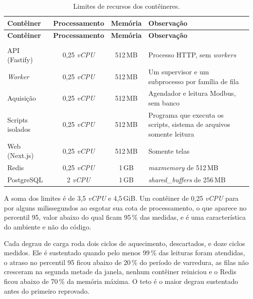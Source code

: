 {\renewcommand{\arraystretch}{1.3}\small
\begin{xltabular}{\textwidth}{lccX}
        \caption{Limites de recursos dos contêineres.}
        \label{tab:cap7_limites}\\
        \hline
        \textbf{Contêiner} & \textbf{Processamento} & \textbf{Memória} & \textbf{Observação} \\
        \hline
        \endfirsthead
        \hline
        \textbf{Contêiner} & \textbf{Processamento} & \textbf{Memória} & \textbf{Observação} \\
        \hline
        \endhead
        \endfoot
         \\
        \endlastfoot
        API (Fastify) & 0,25 \emph{vCPU} & 512\,MB & Processo HTTP, sem \emph{workers} \\
        \hline
        \emph{Worker} & 0,25 \emph{vCPU} & 512\,MB & Um supervisor e um subprocesso por família de fila \\
        \hline
        Aquisição & 0,25 \emph{vCPU} & 512\,MB & Agendador e leitura Modbus, sem banco \\
        \hline
        Scripts isolados & 0,25 \emph{vCPU} & 512\,MB & Programa que executa os scripts, sistema de arquivos somente leitura \\
        \hline
        Web (Next.js) & 0,25 \emph{vCPU} & 512\,MB & Somente telas \\
        \hline
        Redis & 0,25 \emph{vCPU} & 1\,GB & \emph{maxmemory} de 512\,MB \\
        \hline
        PostgreSQL & 2 \emph{vCPU} & 1\,GB & \emph{shared\_buffers} de 256\,MB \\
        \hline
\end{xltabular}}

\par A soma dos limites é de 3,5 \emph{vCPU} e 4,5\,GiB. Um contêiner de 0,25 \emph{vCPU} para por alguns milissegundos ao esgotar sua cota de processamento, o que aparece no percentil 95, valor abaixo do qual ficam 95\,\% das medidas, e é uma característica do ambiente e não do código.

\par Cada degrau de carga roda dois ciclos de aquecimento, descartados, e doze ciclos medidos. Ele é sustentado quando pelo menos 99\,\% das leituras foram atendidas, o atraso no percentil 95 ficou abaixo de 20\,\% do período de varredura, as filas não cresceram na segunda metade da janela, nenhum contêiner reiniciou e o Redis ficou abaixo de 70\,\% da memória máxima. O teto é o maior degrau sustentado antes do primeiro reprovado.

